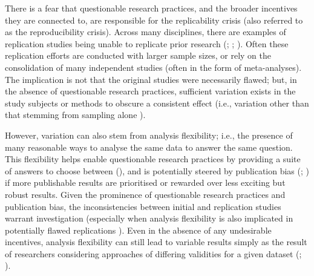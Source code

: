 \documentclass[10pt,a4paper]{article}
\begin{document}
There is a fear that questionable research practices, and the broader incentives they are connected to, are responsible for the replicability crisis (also referred to as the reproducibility crisis).
Across many disciplines, there are examples of replication studies being unable to replicate prior research (; ; ).
Often these replication efforts are conducted with larger sample sizes, or rely on the consolidation of many independent studies (often in the form of meta-analyses).
The implication is not that the original studies were necessarily flawed; but, in the absence of questionable research practices, sufficient variation exists in the study subjects or methods to obscure a consistent effect (i.e., variation other than that stemming from sampling alone ).

However, variation can also stem from analysis flexibility; i.e., the presence of many reasonable ways to analyse the same data to answer the same question.
This flexibility helps enable questionable research practices by providing a suite of answers to choose between (), and is potentially steered by publication bias (; ) if more publishable results are prioritised or rewarded over less exciting but robust results.
Given the prominence of questionable research practices and publication bias, the inconsistencies between initial and replication studies warrant investigation (especially when analysis flexibility is also implicated in potentially flawed replications ).
Even in the absence of any undesirable incentives, analysis flexibility can still lead to variable results simply as the result of researchers considering approaches of differing validities for a given dataset (; ).
\end{document}

